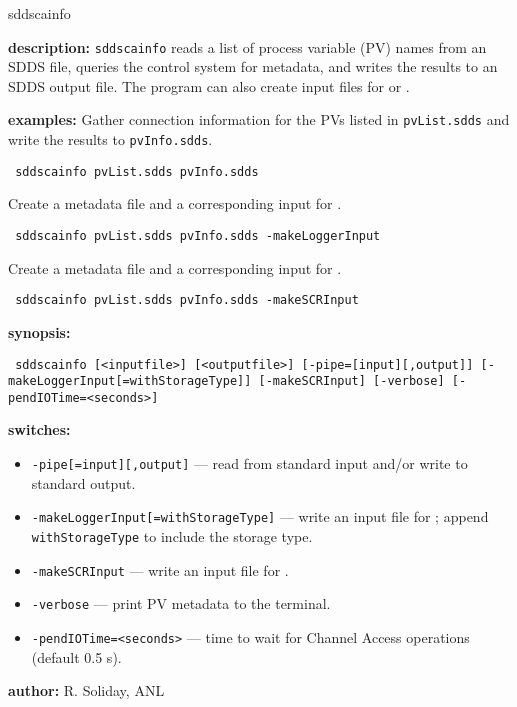 %
%
\begin{sddsprog}{sddscainfo}
\item \textbf{description:}
  \verb+sddscainfo+ reads a list of process variable (PV) names from an SDDS file,
  queries the control system for metadata, and writes the results to an SDDS output file.
  The program can also create input files for  or .

\item \textbf{examples:}
  Gather connection information for the PVs listed in \verb+pvList.sdds+ and write the results to \verb+pvInfo.sdds+.
  \begin{flushleft}{\tt
sddscainfo pvList.sdds pvInfo.sdds
  }\end{flushleft}
  Create a metadata file and a corresponding input for .
  \begin{flushleft}{\tt
sddscainfo pvList.sdds pvInfo.sdds -makeLoggerInput
  }\end{flushleft}
  Create a metadata file and a corresponding input for .
  \begin{flushleft}{\tt
sddscainfo pvList.sdds pvInfo.sdds -makeSCRInput
  }\end{flushleft}

\item \textbf{synopsis:}
  \begin{flushleft}{\tt
sddscainfo [<inputfile>] [<outputfile>]\
[-pipe=[input][,output]]\
[-makeLoggerInput[=withStorageType]]\
[-makeSCRInput]\
[-verbose]\
[-pendIOTime=<seconds>]
  }\end{flushleft}

\item \textbf{switches:}
  \begin{itemize}
  \item {\tt -pipe[=input][,output]} --- read from standard input and/or write to standard output.
  \item {\tt -makeLoggerInput[=withStorageType]} --- write an input file for ; append \verb|withStorageType| to include the storage type.
  \item {\tt -makeSCRInput} --- write an input file for .
  \item {\tt -verbose} --- print PV metadata to the terminal.
  \item {\tt -pendIOTime=<seconds>} --- time to wait for Channel Access operations (default 0.5 s).
  \end{itemize}

\item \textbf{author:} R. Soliday, ANL
\end{sddsprog}
